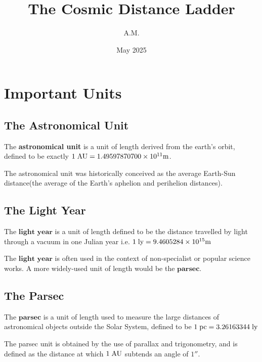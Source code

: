 \documentclass{article}
\title{The Cosmic Distance Ladder}
\author{A.M.}
\date{May 2025}
\theoremstyle{definition}
\begin{document}
\maketitle

\section{Important Units}
\subsection{The Astronomical Unit}
\begin{definition}
    The \textbf{astronomical unit} is a unit of length derived from the earth's orbit, defined to be exactly $1\hspace{0.1cm}\text{AU}=1.49597870700\times10^{11}\text{m}$. 
\end{definition}
\begin{note}
    The astronomical unit was historically conceived as the average Earth-Sun distance(the average of the Earth's aphelion and perihelion distances).
\end{note}
\subsection{The Light Year}
\begin{definition}
    The $\textbf{light year}$ is a unit of length defined to be the distance travelled by light through a vacuum in one Julian year i.e. $1 \hspace{0.1cm}\text{ly}=9.4605284\times 10^{15}\text{m}$
\end{definition}
\begin{note}
    The $\textbf{light year}$ is often used in the context of non-specialist or popular science works. A more widely-used unit of length would be the $\textbf{parsec}$.
\end{note}
\subsection{The Parsec}
\begin{definition}
    The $\textbf{parsec}$ is a unit of length used to measure the large distances of astronomical objects outside the Solar System, defined to be $ 1\hspace{0.1cm}\text{pc}=3.26163344\hspace{0.1cm}\text{ly}$
\end{definition}
\begin{note}
    The parsec unit is obtained by the use of parallax and trigonometry, and is defined as the distance at which $1\hspace{0.1cm}\text{AU}$ subtends an angle of $1''$.
\end{note}
\end{document}
